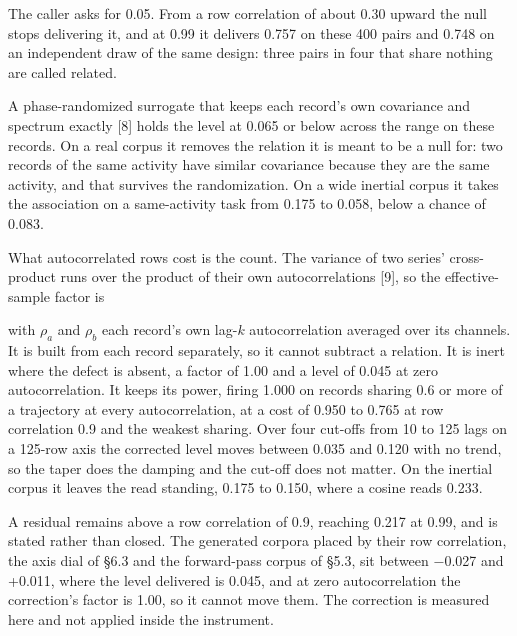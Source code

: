 \documentclass[10pt,letterpaper,twocolumn]{article}
\begin{document}
The caller asks for 0.05. From a row correlation of about 0.30 upward the null stops delivering it,
and at 0.99 it delivers 0.757 on these 400 pairs and 0.748 on an independent draw of the same
design: three pairs in four that share nothing are called related.

A phase-randomized surrogate that keeps each record's own covariance and spectrum exactly {[}8{]} holds
the level at 0.065 or below across the range on these records. On a real corpus it removes the
relation it is meant to be a null for: two records of the same activity have similar covariance
because they are the same activity, and that survives the randomization. On a wide inertial corpus it
takes the association on a same-activity task from 0.175 to 0.058, below a chance of 0.083.

What autocorrelated rows cost is the count. The variance of two series' cross-product runs over the
product of their own autocorrelations {[}9{]}, so the effective-sample factor is


with \(\rho_a\) and \(\rho_b\) each record's own lag-\(k\) autocorrelation averaged over its channels. It
is built from each record separately, so it cannot subtract a relation. It is inert where the defect
is absent, a factor of 1.00 and a level of 0.045 at zero autocorrelation. It keeps its power, firing
1.000 on records sharing 0.6 or more of a trajectory at every autocorrelation, at a cost of 0.950 to
0.765 at row correlation 0.9 and the weakest sharing. Over four cut-offs from 10 to 125 lags on a
125-row axis the corrected level moves between 0.035 and 0.120 with no trend, so the taper does the
damping and the cut-off does not matter. On the inertial corpus it leaves the read standing, 0.175 to
0.150, where a cosine reads 0.233.

A residual remains above a row correlation of 0.9, reaching 0.217 at 0.99, and is stated rather than
closed. The generated corpora placed by their row correlation, the axis dial of §6.3 and the
forward-pass corpus of §5.3, sit between −0.027 and +0.011, where the level delivered is 0.045, and at
zero autocorrelation the correction's factor is 1.00, so it cannot move them. The correction is
measured here and not applied inside the instrument.
\end{document}
